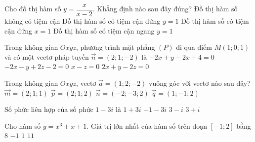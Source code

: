 \begin{ex}%
Cho đồ thị hàm số $y=\dfrac{x}{x-2}$. Khẳng định nào sau đây đúng?
\choice
{Đồ thị hàm số không có tiệm cận}
{Đồ thị hàm số có tiệm cận đứng $y=1$}
{Đồ thị hàm số có tiệm cận đứng $x=1$}
{\True Đồ thị hàm số có tiệm cận ngang $y=1$}
\end{ex}


\begin{ex}%
Trong không gian $Oxyz$, phương trình mặt phẳng $(P)$ đi qua điểm $M\left(1;0;1\right)$ và có một  vectơ pháp tuyến $\overrightarrow{n}=\left(2;1;-2\right)$ là
\choice
{$-2x+y-2x+4=0$}
{$-2x-y+2z-2=0$}
{$x-z=0$}
{\True $2x+y-2z=0$}
\end{ex}


\begin{ex}%
Trong không gian $Oxyz$, vectơ $\overrightarrow{a}=(1;2;-2)$ vuông góc với vectơ nào sau đây?
\choice
{$\overrightarrow{m}=(2;1;1)$}
{\True $\overrightarrow{p}=(2;1;2)$}
{$\overrightarrow{n}=(-2;-3;2)$}
{$\overrightarrow{q}=(1;-1;2)$}
\end{ex}


\begin{ex}%
Số phức liên hợp của số phức $1-3i$ là
\choice
{\True $1+3i$}
{$-1-3i$}
{$3-i$}
{$3+i$}
\end{ex}


\begin{ex}%
Cho hàm số $y=x^3+x+1$. Giá trị lớn nhất của hàm số trên đoạn $[-1;2]$ bằng 
\choice
{$8$}
{$-1$}
{$1$}
{\True $11$}
\end{ex}


